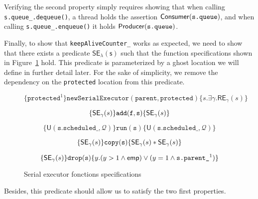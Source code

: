Verifying the second property simply requires showing that when calling \texttt{s.queue\_.dequeue()}, a thread holds the assertion $\mathsf{Consumer}(\texttt{s.queue})$, and when calling \texttt{s.queue\_.enqueue()} it holds $\mathsf{Producer}(\texttt{s.queue})$.

Finally, to show that \texttt{keepAliveCounter\_} works as expected, we need to show that there exists a predicate $\mathsf{SE_{\lambda}(s)}$ such that the function specifications shown in Figure~\ref{fig:seFctSpec} hold. This predicate is parameterized by a ghost location we will define in further detail later. For the sake of simplicity, we remove the dependency on the \texttt{protected} location from this predicate.

\begin{figure}
\[
		\{\texttt{protected}^1\} \mathtt{newSerialExecutor(parent, protected)} \{s. \exists \gamma. \mathsf{RE}_\gamma (s)\}
\]

\[
		\{\mathsf{SE}_\gamma(s)\} \mathtt{add(f, s)} \{\mathsf{SE}_\gamma(s)\}				
\]

\[
		\{\mathsf{U}(\mathtt{s.scheduled\_}, \mathcal{Q})\} \mathtt{run(s)} \{\mathsf{U}(\mathtt{s.scheduled\_}, \mathcal{Q})\}
\]

\[
	\{\mathsf{SE}_\gamma(s)\} \mathtt{copy(s)} \{\mathsf{SE}_\gamma(s) * \mathsf{SE}_\gamma(s)\}
\]

\[
		\{\mathsf{SE}_\gamma(s)\} \mathtt{drop(s)} \{y. (y > 1 \land \mathsf{emp}) \lor (y = 1 \land \texttt{s.parent\_}^1) \}
\]

		\caption{Serial executor fonctions specifications}
		\label{fig:seFctSpec}
\end{figure}

Besides, this predicate should allow us to satisfy the two first properties.
